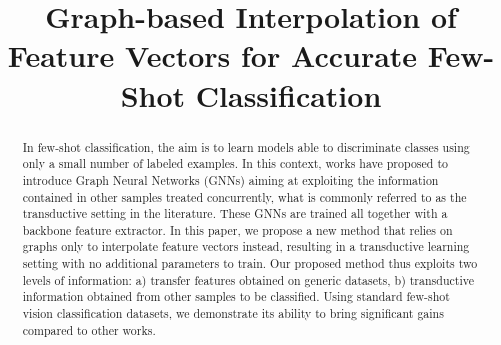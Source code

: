 \documentclass[a4paper,conference]{IEEEtran}
\begin{document}
\title{Graph-based Interpolation of Feature Vectors for Accurate Few-Shot Classification}


\author{
\and
{}
\and
{}
}













\maketitle

\begin{abstract}
In few-shot classification, the aim is to learn models able to discriminate classes using only a small number of labeled examples. In this context, works have proposed to introduce Graph Neural Networks (GNNs) aiming at exploiting the information contained in other samples treated concurrently, what is commonly referred to as the transductive setting in the literature. These GNNs are trained all together with a backbone feature extractor. In this paper, we propose a new method that relies on graphs only to interpolate feature vectors instead, resulting in a transductive learning setting with no additional parameters to train. Our proposed method thus exploits two levels of information: a) transfer features obtained on generic datasets, b) transductive information obtained from other samples to be classified. Using standard few-shot vision classification datasets, we demonstrate its ability to bring significant gains compared to other works.
\end{abstract}






\IEEEpeerreviewmaketitle
\end{document}
